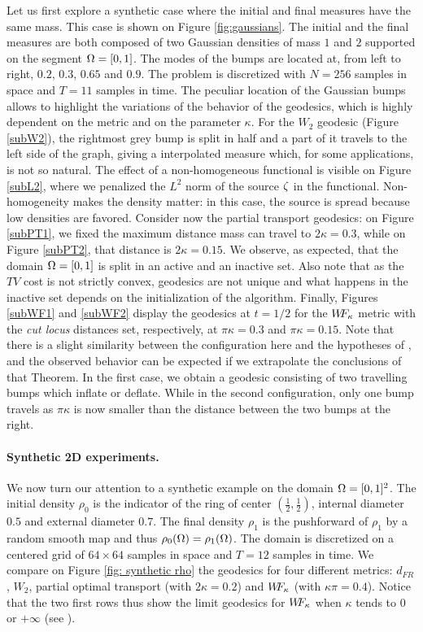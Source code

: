 Let us first explore a synthetic case where the initial and final measures have the same mass. This case is shown on Figure \ref{fig:gaussians}. 
The initial and the final measures are both composed of two Gaussian densities of mass $1$ and $2$ supported on the segment $\Omega=[0,1]$. The modes of the bumps are located at, from left to right, $0.2$, $0.3$, $0.65$ and $0.9$. The problem is discretized with $N=256$ samples in space and $T=11$ samples in time. The peculiar location of the Gaussian bumps allows to highlight the variations of the behavior of the geodesics, which is highly dependent on the metric and on the parameter $\kappa$. 
%
For the $W_2$ geodesic (Figure \ref{subW2}), the rightmost grey bump is split in half and a part of it travels to the left side of the graph, giving a interpolated measure which, for some applications, is not so natural. The effect of a non-homogeneous functional is visible on Figure \ref{subL2}, where we penalized the $L^2$ norm of the source $\zeta$ in the functional. Non-homogeneity makes the density matter: in this case, the source is spread because low densities are favored. 
%
Consider now the partial transport geodesics: on Figure \ref{subPT1}, we fixed the maximum distance mass can travel to $2\kappa=0.3$, while on Figure \ref{subPT2}, that distance is $2\kappa=0.15$. We observe, as expected, that the domain $\Omega=[0,1]$ is split in an active and an inactive set. Also note that as the $TV$ cost is not strictly convex, geodesics are not unique and what happens in the inactive set depends on the initialization of the algorithm.
%
Finally, Figures \ref{subWF1} and \ref{subWF2} display the geodesics at $t=1/2$ for the $W\! \! F_{\kappa}$ metric with the \emph{cut locus} distances set, respectively, at $\pi \kappa=0.3$ and $\pi \kappa = 0.15$. Note that there is a slight similarity between the configuration here and the hypotheses of , and the observed behavior can be expected if we extrapolate the conclusions of that Theorem. In the first case, we obtain a geodesic consisting of two travelling bumps which inflate or deflate. While in the second configuration, only one bump travels as $\pi \kappa$ is now smaller than the distance between the two bumps at the right. 

\paragraph{Synthetic 2D experiments.}
We now turn our attention to a synthetic example on the domain $\Omega=[0,1]^2$. The initial density $\rho_0$ is the indicator of the ring of center $(\frac12, \frac12)$, internal diameter $0.5$ and external diameter $0.7$. The final density $\rho_1$ is the pushforward of $\rho_1$ by a random smooth map and thus $\rho_0(\Omega)=\rho_1(\Omega)$. The domain is discretized on a centered grid of $64\times 64$ samples in space and $T=12$ samples in time. We compare on Figure \ref{fig: synthetic rho} the geodesics for four different metrics: $d_{FR}$, $W_2$, partial optimal transport (with $2\kappa=0.2$) and $W\! \! F_{\kappa}$ (with $\kappa \pi = 0.4$). Notice that the two first rows thus show the limit geodesics for $W\! \! F_{\kappa}$ when $\kappa$ tends to $0$ or $+\infty$ (see ).

